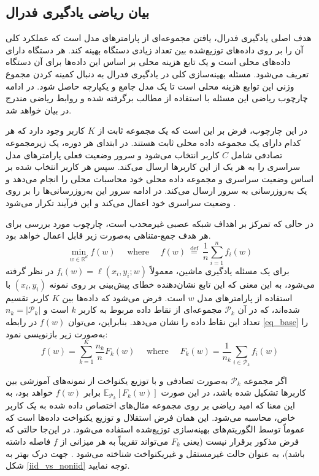 \subsection{
	بیان ریاضی یادگیری فدرال
}\label{sec_FL_math}
هدف اصلی یادگیری فدرال، یافتن مجموعه‌ای از پارامترهای مدل است که عملکرد کلی آن را بر روی داده‌های توزیع‌شده بین تعداد زیادی دستگاه بهینه کند. هر دستگاه دارای داده‌های محلی است و یک تابع هزینه محلی بر اساس این داده‌ها برای آن دستگاه تعریف می‌شود. مسئله بهینه‌سازی کلی در یادگیری فدرال به دنبال کمینه کردن مجموع وزنی این توابع هزینه محلی است تا یک مدل جامع و یکپارچه حاصل شود.
در ادامه چارچوب ریاضی این مسئله با استفاده از مطالب برگرفته شده و روابط ریاضی مندرج در
\cite{mcmahan2017communication}
بیان خواهد شد.


در این چارچوب، فرض بر این است که یک مجموعه ثابت از
$K$
کاربر وجود دارد که هر کدام دارای یک مجموعه داده محلی ثابت هستند. در ابتدای هر دوره، یک زیرمجموعه تصادفی شامل
$C$
کاربر‌ انتخاب می‌شود و سرور وضعیت فعلی پارامترهای مدل سراسری را به هر یک از این کاربر‌ها ارسال می‌کند.
سپس هر کاربر انتخاب ‌شده بر اساس وضعیت سراسری و مجموعه داده محلی خود محاسبات محلی را انجام می‌دهد و یک به‌روزرسانی به سرور ارسال می‌کند.
در ادامه سرور این به‌روزرسانی‌ها را بر روی وضعیت سراسری خود اعمال می‌کند و این فرآیند تکرار می‌شود
\cite{mcmahan2017communication}.


در حالی که تمرکز بر اهداف شبکه عصبی غیرمحدب%
است، چارچوب مورد بررسی برای هر هدف جمع-متناهی%
به‌صورت زیر قابل اعمال خواهد بود.
\begin{equation}
	\min _{w \in \mathbb{R}^d} f(w) \quad \text { where } \quad f(w) \stackrel{\text { def }}{=} \frac{1}{n} \sum_{i=1}^n f_i(w)
	\label{eq_base}
\end{equation}
برای یک مسئله یادگیری ماشین، معمولاً
$f_i(w)=\ell\left(x_i, y_i ; w\right)$
در نظر گرفته می‌شود، به این معنی که این تابع نشان‌دهنده‌ خطای پیش‌بینی بر روی نمونه
$(x_i, y_i)$
با استفاده از پارامترهای مدل
$w$
است. فرض می‌شود که داده‌ها بین
$K$
کاربر تقسیم شده‌اند، که در آن
$\mathcal{P}_k$
مجموعه‌ای از نقاط داده مربوط به کاربر
$k$
است و
$n_k=\left|\mathcal{P}_k\right|$
تعداد این نقاط داده را نشان می‌دهد. بنابراین، می‌توان
\(f(w)\)
در رابطه
\eqref{eq_base}
را به‌صورت زیر بازنویسی نمود:
\begin{equation}
	f(w)=\sum_{k=1}^K \frac{n_k}{n} F_k(w) \quad \text { where } \quad F_k(w)=\frac{1}{n_k} \sum_{i \in \mathcal{P}_k} f_i(w)
\end{equation}


اگر مجموعه 
$\mathcal{P}_k$ 
به‌صورت تصادفی و با توزیع یکنواخت%
از نمونه‌های آموزشی بین کاربر‌ها تشکیل شده باشد، در این صورت 
$\mathbb{E}_{\mathcal{P}_k}\left[F_k(w)\right]$ 
برابر
$f(w)$ 
خواهد بود، به این معنا که امید ریاضی بر روی مجموعه مثال‌های اختصاص داده شده به یک کاربر خاص، محاسبه می‌شود.
این همان فرض
استقلال و توزیع یکنواخت داده‌ها%
است که عموماً توسط الگوریتم‌های بهینه‌سازی توزیع‌شده استفاده می‌شود. در این‌جا حالتی که فرض مذکور برقرار نیست (یعنی
$F_k$
می‌تواند تقریباً به هر میزانی از
$f$
فاصله داشته باشد)، به عنوان حالت
غیرمستقل و غیریکنواخت
شناخته می‌شود
\cite{mcmahan2017communication}.
جهت درک بهتر به شکل
\ref{iid_vs_noniid}
توجه نمایید.


